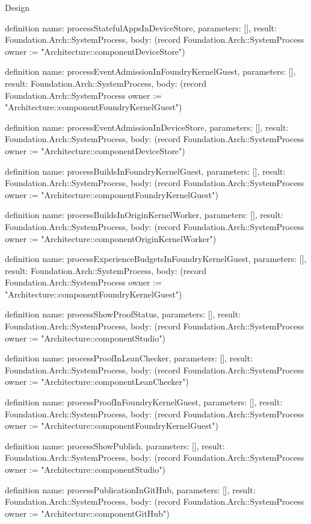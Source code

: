 \begin{lexlean}{Design}
\begin{semanticmodule}
definition{
  name: processStatefulAppsInDeviceStore,
  parameters: [],
  result: Foundation.Arch::SystemProcess,
  body: (record Foundation.Arch::SystemProcess {owner := "Architecture::componentDeviceStore"})
}

definition{
  name: processEventAdmissionInFoundryKernelGuest,
  parameters: [],
  result: Foundation.Arch::SystemProcess,
  body: (record Foundation.Arch::SystemProcess {owner := "Architecture::componentFoundryKernelGuest"})
}

definition{
  name: processEventAdmissionInDeviceStore,
  parameters: [],
  result: Foundation.Arch::SystemProcess,
  body: (record Foundation.Arch::SystemProcess {owner := "Architecture::componentDeviceStore"})
}

definition{
  name: processBuildsInFoundryKernelGuest,
  parameters: [],
  result: Foundation.Arch::SystemProcess,
  body: (record Foundation.Arch::SystemProcess {owner := "Architecture::componentFoundryKernelGuest"})
}

definition{
  name: processBuildsInOriginKernelWorker,
  parameters: [],
  result: Foundation.Arch::SystemProcess,
  body: (record Foundation.Arch::SystemProcess {owner := "Architecture::componentOriginKernelWorker"})
}

definition{
  name: processExperienceBudgetsInFoundryKernelGuest,
  parameters: [],
  result: Foundation.Arch::SystemProcess,
  body: (record Foundation.Arch::SystemProcess {owner := "Architecture::componentFoundryKernelGuest"})
}

definition{
  name: processShowProofStatus,
  parameters: [],
  result: Foundation.Arch::SystemProcess,
  body: (record Foundation.Arch::SystemProcess {owner := "Architecture::componentStudio"})
}

definition{
  name: processProofInLeanChecker,
  parameters: [],
  result: Foundation.Arch::SystemProcess,
  body: (record Foundation.Arch::SystemProcess {owner := "Architecture::componentLeanChecker"})
}

definition{
  name: processProofInFoundryKernelGuest,
  parameters: [],
  result: Foundation.Arch::SystemProcess,
  body: (record Foundation.Arch::SystemProcess {owner := "Architecture::componentFoundryKernelGuest"})
}

definition{
  name: processShowPublish,
  parameters: [],
  result: Foundation.Arch::SystemProcess,
  body: (record Foundation.Arch::SystemProcess {owner := "Architecture::componentStudio"})
}

definition{
  name: processPublicationInGitHub,
  parameters: [],
  result: Foundation.Arch::SystemProcess,
  body: (record Foundation.Arch::SystemProcess {owner := "Architecture::componentGitHub"})
}


\end{semanticmodule}
\end{lexlean}
